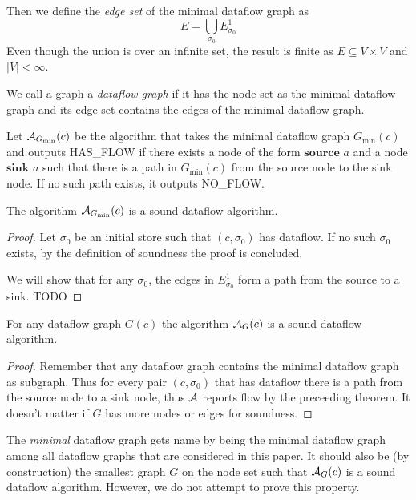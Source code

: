 Then we define the \emph{edge set} of the minimal dataflow graph as
\begin{equation*}
    E = \bigcup_{\sigma_0} E^1_{\sigma_0}
\end{equation*}
Even though the union is over an infinite set, the result is finite
as $E \subseteq V \times V$ and $|V| < \infty$.

We call a graph a \emph{dataflow graph} if it has the node set as the minimal
dataflow graph and its edge set contains the edges of the minimal dataflow 
graph.

Let $\operatorname{\mathcal{A}}_{G_\text{min}}(c)$ be the algorithm that takes the
minimal dataflow graph $G_\text{min}(c)$ and outputs HAS\_FLOW if there 
exists a node of the form 
$\textbf{source }a$ and a node $\textbf{sink }a$ such that there is a path in 
$G_\text{min}(c)$ from the source node to the sink node.
If no such path exists, it outputs NO\_FLOW.



\begin{theorem}
    The algorithm $\operatorname{\mathcal{A}}_{G_\text{min}}(c)$ is a sound dataflow algorithm.
\end{theorem}
\begin{proof}
    Let $\sigma_0$ be an initial store such that $(c, \sigma_0)$ has dataflow.
    If no such $\sigma_0$ exists, by the definition of soundness
    the proof is concluded.

    We will show that for any $\sigma_0$, the edges in $E^1_{\sigma_0}$
    form a path from the source to a sink.
    TODO
\end{proof}

\begin{corollary}
    \label{cor:dg-sound}
    For any dataflow graph $G(c)$ the algorithm $\operatorname{\mathcal{A}}_{G}(c)$ is a sound
     dataflow algorithm.
\end{corollary}
\begin{proof}
    Remember that any dataflow graph contains the minimal dataflow graph as 
    subgraph. Thus for every pair $(c, \sigma_0)$ that has dataflow
    there is a path from the source node to a sink node, 
    thus $\operatorname{\mathcal{A}}$ reports flow by the preceeding theorem.
    It doesn't matter if $G$ has more nodes or edges for soundness.
\end{proof}

\begin{remark}
    The \emph{minimal} dataflow graph gets name by being the minimal dataflow graph
    among all dataflow graphs that are considered in this paper.
    It should also be (by construction) the smallest graph $G$ on the node set 
    such that $\operatorname{\mathcal{A}}_G(c)$ is a sound dataflow algorithm.
    However, we do not attempt to prove this property.
\end{remark}

